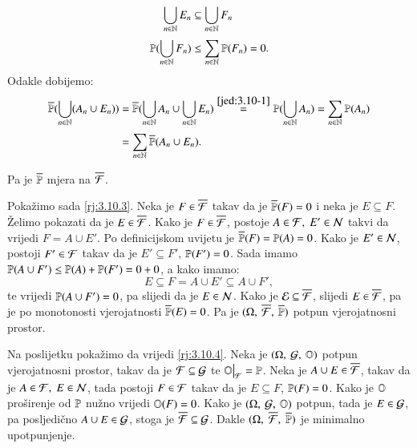 \begin{rj}[\ref{zad:3.10}]
\begin{enumerate}[label=(\roman*)]
        \begin{equation}    \label{jed:3.10-1}
            \begin{aligned}
                \bigcup\limits_{n \in \mathbb{N}}^{} E_n &\subseteq \bigcup\limits_{n \in \mathbb{N}}^{} F_n\\
                \mathbb{P}({\bigcup\limits_{n \in \mathbb{N}}^{} F_n}) &\leq \sum\limits_{n \in \mathbb{N}}^{} \mathbb{P}({F_n}) = 0.
            \end{aligned}
        \end{equation}
        Odakle dobijemo:
        \begin{equation*}
            \begin{aligned}
                \overline{\mathbb{P}} (\bigcup\limits_{n \in \mathbb{N}}^{} (A_n \cup E_n)) &= \overline{\mathbb{P}} (\bigcup\limits_{n \in \mathbb{N}}^{} A_n \cup \bigcup\limits_{n \in \mathbb{N}}^{} E_n) \overset{\eqref{jed:3.10-1}}{=} \mathbb{P}({\bigcup\limits_{n \in \mathbb{N}}^{} A_n}) = \sum\limits_{n \in \mathbb{N}}^{} \mathbb{P}({A_n})\\ &= \sum\limits_{n \in \mathbb{N}}^{} \overline{\mathbb{P}} (A_n \cup E_n).
            \end{aligned}
        \end{equation*}
    \end{enumerate}
    Pa je $\overline{\mathbb{P}}$ mjera na $\overline{\mathcal{F}}$.

    Poka\v zimo sada \ref{rj:3.10.3}.
    Neka je $F \in \overline{\mathcal{F}}$ takav da je $\overline{\mathbb{P}} (F) = 0$ i neka je $E \subseteq F$.
    \v Zelimo pokazati da je $E \in \overline{\mathcal{F}}$.
    Kako je $F \in \overline{\mathcal{F}}$, postoje $A \in \mathcal{F}, \; E' \in \mathcal{N}$ takvi da vrijedi $F = A \cup E'$.
    Po definicijskom uvijetu je $\overline{\mathbb{P}} (F) = \mathbb{P}({A}) = 0$.
    Kako je $E' \in \mathcal{N}$, postoji $F' \in \mathcal{F}$ takav da je $E' \subseteq F'$, $\mathbb{P}({F'}) = 0$.
    Sada imamo $\mathbb{P}({A \cup F'}) \leq \mathbb{P}({A}) + \mathbb{P}({F'}) = 0 + 0$, a kako imamo:
    \begin{equation*}
        E \subseteq F = A \cup E' \subseteq A \cup F',
    \end{equation*}
    te vrijedi $\mathbb{P}({A \cup F'}) = 0$, pa slijedi da je $E \in \mathcal{N}$.
    Kako je $\mathcal{E} \subseteq \overline{\mathcal{F}}$, slijedi $E \in \overline{\mathcal{F}}$, pa je po monotonosti vjerojatnosti $\overline{\mathbb{P}} (E) = 0$.
    Pa je $(\Omega, \: \overline{\mathcal{F}}, \: \overline{\mathbb{P}})$ potpun vjerojatnosni prostor.

    Na poslijetku poka\v zimo da vrijedi \ref{rj:3.10.4}.
    Neka je $(\Omega, \: \mathcal{G}, \: \mathbb{O})$ potpun vjerojatnosni prostor, takav da je $\mathcal{F} \subseteq \mathcal{G}$ te $\restr{\masO}{\famF} = \masP$.
    Neka je $A \cup E \in \overline{\mathcal{F}}$, takav da je $A \in \mathcal{F}, \; E \in \mathcal{N}$, tada postoji $F \in \mathcal{F}$ takav da je $E \subseteq F$, $\mathbb{P}({F}) = 0$.
    Kako je $\mathbb{O}$ pro\v sirenje od $\mathbb{P}$ nu\v zno vrijedi $\mathbb{O} (F) = 0$.
    Kako je $(\Omega, \: \mathcal{G}, \: \mathbb{O})$ potpun, tada je $E \in \mathcal{G}$, pa posljedi\v cno $A \cup E \in \mathcal{G}$, stoga je $\overline{\mathcal{F}} \subseteq \mathcal{G}$.
    Dakle $(\Omega, \; \overline{\mathcal{F}}, \; \overline{\mathbb{P}})$ je minimalno upotpunjenje.
    

\end{rj}

